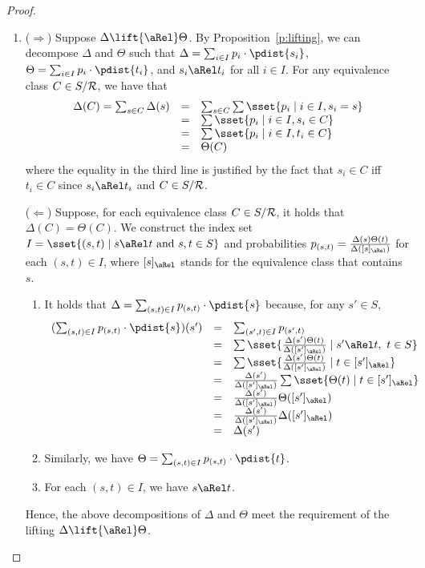 \documentclass{article}
\begin{document}
\begin{proof}
\begin{enumerate}
\item
($\Rightarrow$) Suppose $\Delta\lift{\aRel}\Theta$. By
Proposition~\ref{p:lifting}, we can decompose $\Delta$ and $\Theta$
such that $\Delta=\sum_{i\in I}p_i\cdot\pdist{s_i}$,
$\Theta=\sum_{i\in I}p_i\cdot\pdist{t_i}$, and $s_i\aRel t_i$ for
all $i\in I$. For any equivalence class $C\in S/{\cal R}$, we have
that
\[\begin{array}{rcl}
\Delta(C) = \sum_{s\in C}\Delta(s) & = & \sum_{s\in
C}\sum\sset{p_i\mid i\in I, s_i=s}\\
& = & \sum\sset{p_i\mid i\in I, s_i\in C}\\
& = & \sum\sset{p_i\mid i\in I, t_i\in C}\\
& = & \Theta(C)
\end{array}\]
where the equality in the third line is justified by the fact that
$s_i\in C$ iff $t_i\in C$ since $s_i\aRel t_i$ and $C\in S/{\cal
R}$.

($\Leftarrow$) Suppose, for each equivalence class $C\in S/{\cal
R}$, it holds that $\Delta(C)=\Theta(C)$. We construct the index set
$I=\sset{(s,t)\mid s\aRel t \mbox{ and } s,t\in S}$ and
probabilities
$p_{(s,t)}=\frac{\Delta(s)\Theta(t)}{\Delta([s]_{\aRel})}$ for each
$(s,t)\in I$, where $[s]_{\aRel}$ stands for the equivalence class
that contains $s$.
\begin{enumerate}
\item It holds that $\Delta=\sum_{(s,t)\in I}p_{(s,t)}\cdot\pdist{s}$
because, for any $s'\in S$,
\[\begin{array}{rcl}
(\sum_{(s,t)\in I}p_{(s,t)}\cdot\pdist{s})(s') & = & \sum_{(s',t)\in
I}p_{(s',t)}\\
& = & \sum\sset{\frac{\Delta(s')\Theta(t)}{\Delta([s']_{\aRel})}\mid s'\aRel t,\ t\in S}\\
& = & \sum\sset{\frac{\Delta(s')\Theta(t)}{\Delta([s']_{\aRel})}\mid t\in [s']_{\aRel}}\\
& = & \frac{\Delta(s')}{\Delta([s']_{\aRel})}\sum\sset{\Theta(t)\mid
t\in [s']_{\aRel}}\\
& = & \frac{\Delta(s')}{\Delta([s']_{\aRel})}\Theta([s']_{\aRel})\\
& = & \frac{\Delta(s')}{\Delta([s']_{\aRel})}\Delta([s']_{\aRel})\\
& = & \Delta(s')
\end{array}\]
\item Similarly, we have $\Theta=\sum_{(s,t)\in
I}p_{(s,t)}\cdot\pdist{t}$.
\item For each $(s,t)\in I$, we have $s\aRel
t$.
\end{enumerate}
Hence, the above decompositions of $\Delta$ and $\Theta$ meet the
requirement of the lifting $\Delta\lift{\aRel}\Theta$.
\end{enumerate}
\end{proof}
\end{document}
